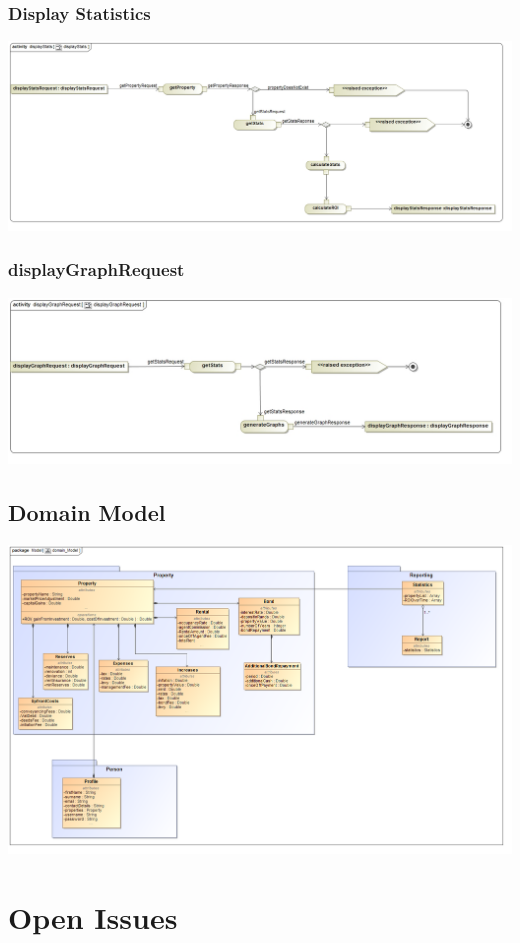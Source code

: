 \documentclass[a4paper,12pt]{article}
\begin{document}
\subsubsection{Display Statistics}
\includegraphics[width=1\textwidth]{./Images/processSpecification/displayStatsActivity.jpg}
\subsubsection{displayGraphRequest}
\includegraphics[width=1\textwidth]{./Images/processSpecification/displayGraphRequestActivity.jpg}


\subsection{Domain Model}
\includegraphics[width=1\textwidth]{./domainModel/domain_Model.PNG}


\newpage
\section{Open Issues}
\end{document}
